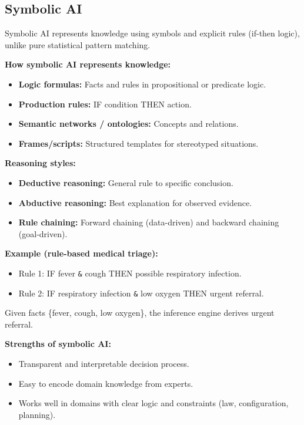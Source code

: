 \documentclass[12pt,a4paper]{article}
\begin{document}
\subsection*{Symbolic AI}
Symbolic AI represents knowledge using symbols and explicit rules (if-then logic), unlike pure statistical pattern matching.

\textbf{How symbolic AI represents knowledge:}
\begin{itemize}[noitemsep]
    \item \textbf{Logic formulas:} Facts and rules in propositional or predicate logic.
    \item \textbf{Production rules:} IF condition THEN action.
    \item \textbf{Semantic networks / ontologies:} Concepts and relations.
    \item \textbf{Frames/scripts:} Structured templates for stereotyped situations.
\end{itemize}

\textbf{Reasoning styles:}
\begin{itemize}[noitemsep]
    \item \textbf{Deductive reasoning:} General rule to specific conclusion.
    \item \textbf{Abductive reasoning:} Best explanation for observed evidence.
    \item \textbf{Rule chaining:} Forward chaining (data-driven) and backward chaining (goal-driven).
\end{itemize}

\textbf{Example (rule-based medical triage):}
\begin{itemize}[noitemsep]
    \item Rule 1: IF fever \texttt{\&} cough THEN possible respiratory infection.
    \item Rule 2: IF respiratory infection \texttt{\&} low oxygen THEN urgent referral.
\end{itemize}
Given facts \{fever, cough, low oxygen\}, the inference engine derives urgent referral.

\textbf{Strengths of symbolic AI:}
\begin{itemize}[noitemsep]
    \item Transparent and interpretable decision process.
    \item Easy to encode domain knowledge from experts.
    \item Works well in domains with clear logic and constraints (law, configuration, planning).
\end{itemize}
\end{document}

